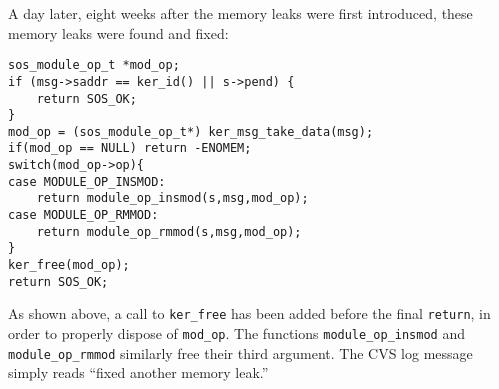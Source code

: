 A day later, eight weeks after the memory leaks were first introduced,
these memory leaks were found and fixed:

\begin{scriptsize}
\begin{verbatim}
sos_module_op_t *mod_op;
if (msg->saddr == ker_id() || s->pend) {
    return SOS_OK;
}
mod_op = (sos_module_op_t*) ker_msg_take_data(msg);
if(mod_op == NULL) return -ENOMEM;
switch(mod_op->op){
case MODULE_OP_INSMOD:
    return module_op_insmod(s,msg,mod_op);
case MODULE_OP_RMMOD:
    return module_op_rmmod(s,msg,mod_op);
}
ker_free(mod_op);
return SOS_OK;
\end{verbatim}
\end{scriptsize}

As shown above, a call to {\tt ker\_free} has been added before the
final {\tt return}, in order to properly dispose of {\tt mod\_op}.
The functions {\tt module\_op\_insmod} and {\tt module\_op\_rmmod}
similarly free their third argument.  The CVS log message simply reads
``fixed another memory leak.''





